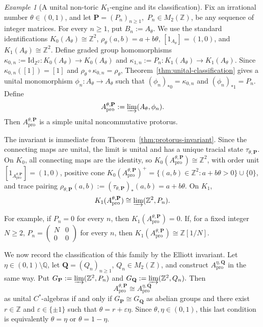 \documentclass[11pt]{amsart}
\theoremstyle{definition}
\theoremstyle{remark}
\newtheorem{example}[theorem]{Example}
\newcommand{\Z}{\mathbb{Z}}
\newcommand{\Q}{\mathbb Q}
\newcommand{\id}{\mathrm{Id}}
\newcommand{\ex}{\mathrm{pro}}
\begin{document}
\begin{example}[A unital non-toric $K_1$-engine and its classification]
\label{ex:exotic-K1-engine}
Fix an irrational number $\theta\in(0,1)$, and let $\mathbf P=(P_n)_{n\geq1},$ $P_n\in M_2(\Z)$,
be any sequence of integer matrices. For every $n\geq1$, put
$B_n:=A_\theta$. We use the standard identifications $K_0(A_\theta)\cong\Z^2$, $\rho_\theta(a,b)=a+b\theta$, 
$[1_{A_\theta}]=(1,0)$,
and $K_1(A_\theta)\cong\Z^2.$
Define graded group homomorphisms $\kappa_{0,n}:=\id_{\Z^2}\colon K_0(A_\theta)\to K_0(A_\theta)$ and $\kappa_{1,n}:=P_n\colon K_1(A_\theta)\to K_1(A_\theta).$ Since $\kappa_{0,n}([1])=[1]$ and $\rho_\theta\circ\kappa_{0,n}=\rho_\theta$, Theorem~\ref{thm:unital-classification} gives a unital monomorphism $\phi_n\colon A_\theta\to A_\theta$
such that $(\phi_n)_{*0}=\kappa_{0,n}$ and 
$(\phi_n)_{*1}=P_n.$ Define
\[
A_{\ex}^{\theta,\mathbf P}
:=
\varinjlim(A_\theta,\phi_n).
\]
Then $A_{\ex}^{\theta,\mathbf P}$ is a simple unital noncommutative
protorus.

The invariant is immediate from Theorem~\ref{thm:protorus-invariant}. Since the
connecting maps are unital, the limit is unital and has a unique tracial state
$\tau_{\theta,\mathbf P}$. On $K_0$, all connecting maps are the identity,
so $K_0(A_{\ex}^{\theta,\mathbf P})\cong\Z^2$,
with order unit $[1_{A_{\ex}^{\theta,\mathbf P}}]=(1,0)$, 
positive cone $K_0(A_{\ex}^{\theta,\mathbf P})^+=\{(a,b)\in\Z^2:a+b\theta>0\}\cup\{0\}$,
and trace pairing $\rho_{\theta,\mathbf P}(a,b)
:=(\tau_{\theta,\mathbf P})_*(a,b)
=a+b\theta.$
On $K_1$, \[K_1(A_{\ex}^{\theta,\mathbf P})\cong
\varinjlim(\Z^2,P_n).\]

For example, if $P_n=0$ for every $n$, then $K_1(A_{\ex}^{\theta,\mathbf P})=0.$
If, for a fixed integer $N\geq2$, $P_n=
\begin{pmatrix}
N&0\\
0&0
\end{pmatrix}$
for every $n$, then $K_1(A_{\ex}^{\theta,\mathbf P})\cong \Z[1/N].$

We now record the classification of this family by the Elliott invariant. Let
$\eta\in(0,1)\setminus\Q$, let $\mathbf Q=(Q_n)_{n\geq1}$, $Q_n\in M_2(\Z)$,
and construct $A_{\ex}^{\eta,\mathbf Q}$ in the same way. Put $G_{\mathbf P}:=\varinjlim(\Z^2,P_n)$ and $G_{\mathbf Q}:=\varinjlim(\Z^2,Q_n).$
Then
\[
A_{\ex}^{\theta,\mathbf P}
\cong
A_{\ex}^{\eta,\mathbf Q}
\]
as unital $C^*$-algebras if and only if
$G_{\mathbf P}\cong G_{\mathbf Q}$
as abelian groups and there exist $r\in\Z$ and $\varepsilon\in\{\pm1\}$
such that $\theta=r+\varepsilon\eta.$
Since $\theta,\eta\in(0,1)$, this last condition is equivalently $\theta=\eta$ or $\theta=1-\eta$.


\end{example}
\end{document}
